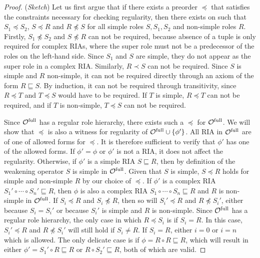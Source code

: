 \documentclass[
]{ceurart}
\begin{document}
\begin{proof}(\emph{Sketch}) \label{proof:regularity}
  Let us first argue that if there exists a preorder $\preceq$ that satisfies the constraints necessary for checking regularity, then there exists on such that $S_1 \preceq S_2$, $S \preceq R$ and $R \not\preceq S$ for all simple roles $S, S_1, S_2$ and non-simple roles $R$. Firstly, $S_1 \not\preceq S_2$ and $S \not\preceq R$ can not be required, because absence of a tuple is only required for complex RIAs, where the super role must not be a predecessor of the roles on the left-hand side. Since $S_1$ and $S$ are simple, they do not appear as the super role in a complex RIA. Similarly, $R \prec S$ can not be required. Since $S$ is simple and $R$ non-simple, it can not be required directly through an axiom of the form $R \sqsubseteq S$. By induction, it can not be required through transitivity, since $R \preceq T$ and $T \preceq S$ would have to be required. If $T$ is simple, $R \preceq T$ can not be required, and if $T$ is non-simple, $T \preceq S$ can not be required.

  Since ${\mathcal{O}^\textnormal{full}}$ has a regular role hierarchy, there exists such a $\preceq$ for ${\mathcal{O}^\textnormal{full}}$. We will show that $\preceq$ is also a witness for regularity of ${\mathcal{O}^\textnormal{full}} \cup \{ \phi' \}$. All RIA in ${\mathcal{O}^\textnormal{full}}$ are of one of allowed forms for $\preceq$. It is therefore sufficient to verify that $\phi'$ has one of the allowed forms.
  If $\phi' = \phi$ or $\phi'$ is not a RIA, it does not affect the regularity.
  Otherwise, if $\phi'$ is a simple RIA $S \sqsubseteq R$, then by definition of the weakening operator $S$ is simple in ${\mathcal{O}^\textnormal{full}}$. Given that $S$ is simple, $S \preceq R$ holds for simple and non-simple $R$ by our choice of $\preceq$.
  If $\phi'$ is a complex RIA $S_1' \circ \cdots \circ S_n' \sqsubseteq R$, then $\phi$ is also a complex RIA $S_1 \circ \cdots \circ S_n \sqsubseteq R$ and $R$ is non-simple in ${\mathcal{O}^\textnormal{full}}$. If $S_i \preceq R$ and $S_i \not\preceq R$, then so will $S_i' \preceq R$ and $R \not\preceq S_i'$, either because $S_i = S_i'$ or because $S_i'$ is simple and $R$ is non-simple. Since ${\mathcal{O}^\textnormal{full}}$ has a regular role hierarchy, the only case in which $R \preceq S_i$ is if $S_i = R$. In this case, $S_i' \preceq R$ and $R \not\preceq S_i'$ will still hold if $S_i \not= R$. If $S_i = R$, either $i = 0$ or $i = n$ which is allowed. The only delicate case is if $\phi = R \circ R \sqsubseteq R$, which will result in either $\phi' = S_1' \circ R \sqsubseteq R$ or $R \circ S_2' \sqsubseteq R$, both of which are valid.
\end{proof}
\end{document}

